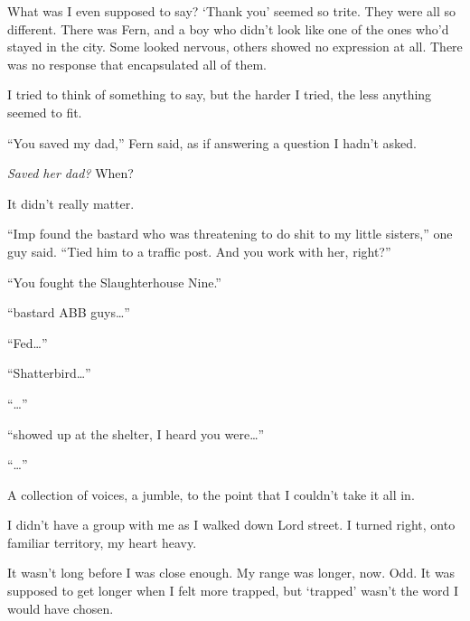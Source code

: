 What was I even supposed to say?  `Thank you' seemed so trite.  They were all so different.  There was Fern, and a boy who didn't look like one of the ones who'd stayed in the city.  Some looked nervous, others showed no expression at all.  There was no response that encapsulated all of them.



I tried to think of something to say, but the harder I tried, the less anything seemed to fit.



``You saved my dad,'' Fern said, as if answering a question I hadn't asked.



\emph{Saved her dad?}  When?



It didn't really matter.



``Imp found the bastard who was threatening to do shit to my little sisters,'' one guy said. ``Tied him to a traffic post.  And you work with her, right?''



``You fought the Slaughterhouse Nine.''



``\ldotsthose bastard ABB guys\ldots''



``Fed\ldots''



``\ldotswhen Shatterbird\ldots''



``\ldotsMannequin\ldots''



``\ldotsLeviathan showed up at the shelter, I heard you were\ldots''



``\ldotsEmpire\ldots''



A collection of voices, a jumble, to the point that I couldn't take it all in.



\blacksquare



I didn't have a group with me as I walked down Lord street.  I turned right, onto familiar territory, my heart heavy.



It wasn't long before I was close enough.  My range was longer, now.  Odd.  It was supposed to get longer when I felt more trapped, but `trapped' wasn't the word I would have chosen.



